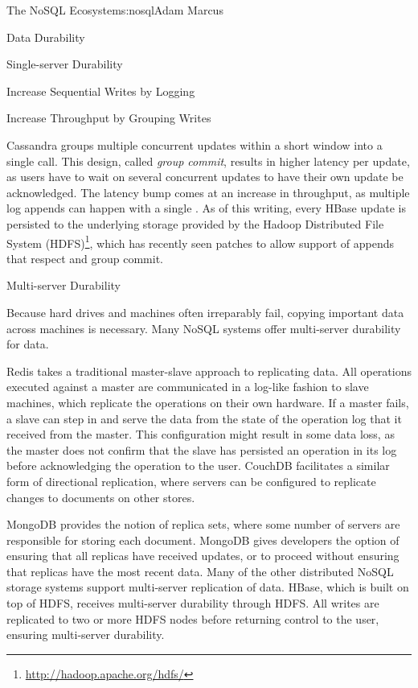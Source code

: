 \begin{aosachapter}{The NoSQL Ecosystem}{s:nosql}{Adam Marcus}
\begin{aosasect1}{Data Durability}
\begin{aosasect2}{Single-server Durability}
\begin{aosasect3}{Increase Sequential Writes by Logging}
\end{aosasect3}

\begin{aosasect3}{Increase Throughput by Grouping Writes}

Cassandra groups multiple concurrent updates within a short window
into a single  call.  This design, called \emph{group
commit}, results in higher latency per update, as users have to wait
on several concurrent updates to have their own update be
acknowledged.  The latency bump comes at an increase in throughput, as
multiple log appends can happen with a single .  As of
this writing, every HBase update is persisted to the underlying
storage provided by the Hadoop Distributed File System
(HDFS)\footnote{\url{http://hadoop.apache.org/hdfs/}}, which has
recently seen patches to allow support of appends that respect
 and group commit.

\end{aosasect3}

\end{aosasect2}

\begin{aosasect2}{Multi-server Durability}

Because hard drives and machines often irreparably fail, copying
important data across machines is necessary.  Many NoSQL systems offer
multi-server durability for data.

Redis takes a traditional master-slave approach to replicating data.
All operations executed against a master are communicated in a
log-like fashion to slave machines, which replicate the operations on
their own hardware.  If a master fails, a slave can step in and serve
the data from the state of the operation log that it received from the
master.  This configuration might result in some data loss, as the
master does not confirm that the slave has persisted an operation in
its log before acknowledging the operation to the user.  CouchDB
facilitates a similar form of directional replication, where servers
can be configured to replicate changes to documents on other stores.

MongoDB provides the notion of replica sets, where some number of
servers are responsible for storing each document.  MongoDB gives
developers the option of ensuring that all replicas have received
updates, or to proceed without ensuring that replicas have the most
recent data.  Many of the other distributed NoSQL storage systems
support multi-server replication of data.  HBase, which is built on
top of HDFS, receives multi-server durability through HDFS\@.  All
writes are replicated to two or more HDFS nodes before returning
control to the user, ensuring multi-server durability.


\end{aosasect2}
\end{aosasect1}
\end{aosachapter}
